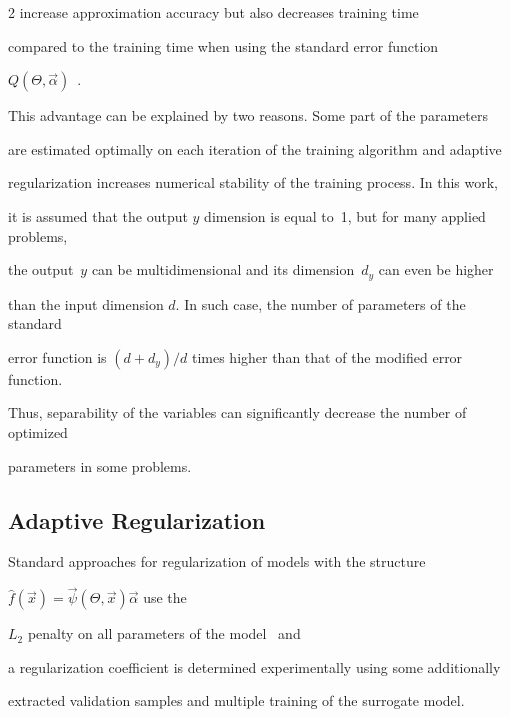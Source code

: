 \begin{multicols}{2}
increase approximation accuracy but also decreases training time 

compared to the training time when using the standard error function

 $Q\left( \Theta, \vec \alpha \right)$~\cite{itas11_Belyaev}.

This advantage can be explained by two reasons. Some part of the parameters 

are estimated optimally on each iteration of the training algorithm and adaptive 

regularization increases numerical stability of the training process. In this work,

it is assumed that the output $y$ dimension is equal to~1, but for many applied problems, 

the output~$y$ can be multidimensional and its dimension~$d_y$ can even be higher 

than the input dimension $d$. In such case, the number of parameters of the standard 

error function is $({d+d_y})/{d}$ times higher than that of the modified error function.

Thus, separability of the variables can significantly decrease the number of optimized 

parameters in some problems.

{ %



}



\subsection{Adaptive Regularization}

\label{regularization}



\noindent

Standard approaches for regularization of models with the structure

 $\hat f \left( {\vec x} \right) = {\vec \psi} \left( {\Theta}, {\vec x} \right) 

 {\vec \alpha}$ use the 

  $L_2$ penalty on all parameters of the model~\cite{elementsOfStatLearning} and 

  a regularization coefficient is determined experimentally using some additionally 

  extracted validation samples and multiple training of the surrogate model.


\end{multicols}
